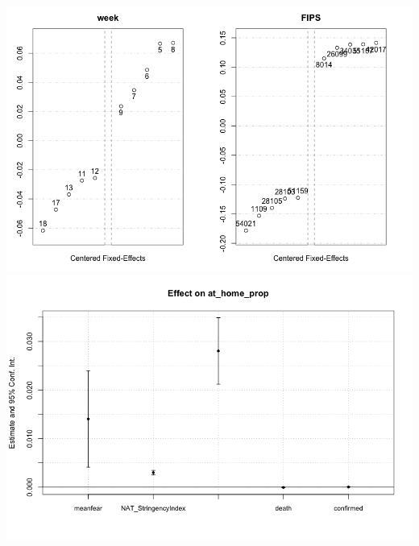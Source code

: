 \documentclass{article}
\begin{document}
\includegraphics[width=\textwidth]{figs/est1_fixef.png}
\includegraphics[width=\textwidth]{figs/coefplot_est1.png}
\end{document}
